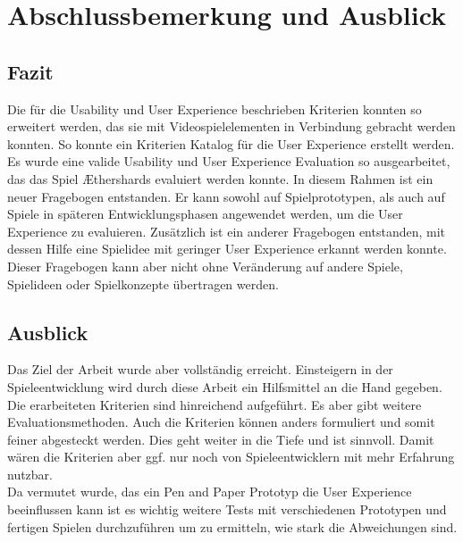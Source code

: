 \chapter{Abschlussbemerkung und Ausblick}


\section{Fazit} 
\label{Abschnitt:}
Die für die Usability und User Experience beschrieben Kriterien konnten so erweitert werden, das sie mit Videospielelementen in Verbindung gebracht werden konnten. So konnte ein Kriterien Katalog für die User Experience erstellt werden. Es wurde eine valide Usability und User Experience Evaluation so ausgearbeitet, das das Spiel Æthershards evaluiert werden konnte. In diesem Rahmen ist ein neuer Fragebogen entstanden. Er kann sowohl auf Spielprototypen, als auch auf Spiele in späteren Entwicklungsphasen angewendet werden, um die User Experience zu evaluieren. Zusätzlich ist ein anderer Fragebogen entstanden, mit dessen Hilfe eine Spielidee mit geringer User Experience erkannt werden konnte. Dieser Fragebogen kann aber nicht ohne Veränderung auf andere Spiele, Spielideen oder Spielkonzepte übertragen werden. 


\section{Ausblick}
\label{Abschnitt:}
Das Ziel der Arbeit wurde aber vollständig erreicht. Einsteigern in der Spieleentwicklung wird durch diese Arbeit ein Hilfsmittel an die Hand gegeben. Die erarbeiteten Kriterien sind hinreichend aufgeführt. Es aber gibt weitere Evaluationsmethoden. Auch die Kriterien können anders formuliert und somit feiner abgesteckt werden. Dies geht weiter in die Tiefe und ist sinnvoll. Damit wären die Kriterien aber ggf. nur noch von Spieleentwicklern mit mehr Erfahrung nutzbar. \\
Da vermutet wurde, das ein Pen and Paper Prototyp die User Experience beeinflussen kann ist es wichtig weitere Tests mit verschiedenen Prototypen und fertigen Spielen durchzuführen um zu ermitteln, wie stark die Abweichungen sind. 